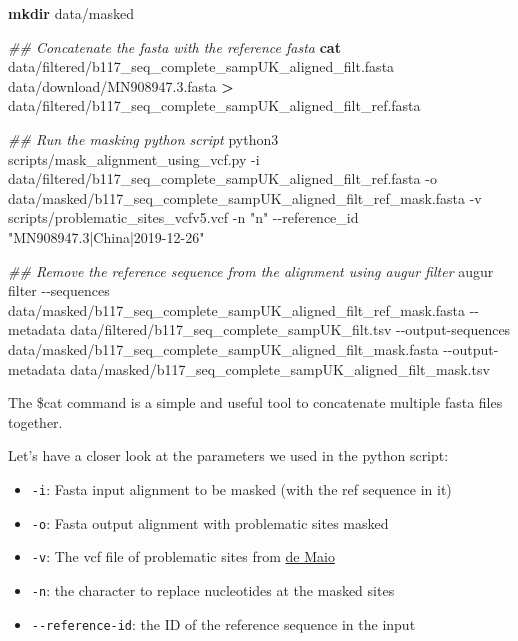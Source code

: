 \documentclass[
]{book}
\newenvironment{Shaded}{\begin{snugshade}}{\end{snugshade}}
\newcommand{\AttributeTok}[1]{\textcolor[rgb]{0.13,0.29,0.53}{#1}}
\newcommand{\CommentTok}[1]{\textcolor[rgb]{0.56,0.35,0.01}{\textit{#1}}}
\newcommand{\ExtensionTok}[1]{#1}
\newcommand{\FunctionTok}[1]{\textcolor[rgb]{0.13,0.29,0.53}{\textbf{#1}}}
\newcommand{\NormalTok}[1]{#1}
\newcommand{\OperatorTok}[1]{\textcolor[rgb]{0.81,0.36,0.00}{\textbf{#1}}}
\newcommand{\StringTok}[1]{\textcolor[rgb]{0.31,0.60,0.02}{#1}}
\providecommand{\tightlist}{%
  \setlength{\itemsep}{0pt}\setlength{\parskip}{0pt}}
\begin{document}
\begin{Shaded}
\begin{Highlighting}[]
\FunctionTok{mkdir}\NormalTok{ data/masked}

\CommentTok{\#\# Concatenate the fasta with the reference fasta}
\FunctionTok{cat}\NormalTok{ data/filtered/b117\_seq\_complete\_sampUK\_aligned\_filt.fasta data/download/MN908947.3.fasta }\OperatorTok{\textgreater{}}\NormalTok{ data/filtered/b117\_seq\_complete\_sampUK\_aligned\_filt\_ref.fasta}

\CommentTok{\#\# Run the masking python script}
\ExtensionTok{python3}\NormalTok{ scripts/mask\_alignment\_using\_vcf.py }\AttributeTok{{-}i}\NormalTok{ data/filtered/b117\_seq\_complete\_sampUK\_aligned\_filt\_ref.fasta }\AttributeTok{{-}o}\NormalTok{ data/masked/b117\_seq\_complete\_sampUK\_aligned\_filt\_ref\_mask.fasta }\AttributeTok{{-}v}\NormalTok{ scripts/problematic\_sites\_vcfv5.vcf }\AttributeTok{{-}n} \StringTok{"n"} \AttributeTok{{-}{-}reference\_id} \StringTok{"MN908947.3|China|2019{-}12{-}26"}

\CommentTok{\#\# Remove the reference sequence from the alignment using augur filter}
\ExtensionTok{augur}\NormalTok{ filter }\AttributeTok{{-}{-}sequences}\NormalTok{ data/masked/b117\_seq\_complete\_sampUK\_aligned\_filt\_ref\_mask.fasta }\AttributeTok{{-}{-}metadata}\NormalTok{ data/filtered/b117\_seq\_complete\_sampUK\_filt.tsv }\AttributeTok{{-}{-}output{-}sequences}\NormalTok{ data/masked/b117\_seq\_complete\_sampUK\_aligned\_filt\_mask.fasta }\AttributeTok{{-}{-}output{-}metadata}\NormalTok{ data/masked/b117\_seq\_complete\_sampUK\_aligned\_filt\_mask.tsv}
\end{Highlighting}
\end{Shaded}

The \$cat command is a simple and useful tool to concatenate multiple fasta files together.

Let's have a closer look at the parameters we used in the python script:

\begin{itemize}
\tightlist
\item
  \texttt{-i}: Fasta input alignment to be masked (with the ref sequence in it)
\item
  \texttt{-o}: Fasta output alignment with problematic sites masked
\item
  \texttt{-v}: The vcf file of problematic sites from \href{https://virological.org/t/masking-strategies-for-sars-cov-2-alignments/480}{de Maio}
\item
  \texttt{-n}: the character to replace nucleotides at the masked sites
\item
  \texttt{-\/-reference-id}: the ID of the reference sequence in the input
\end{itemize}
\end{document}
